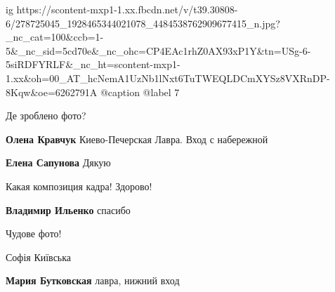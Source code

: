  
 
 
 
 

\ifcmt
  ig https://scontent-mxp1-1.xx.fbcdn.net/v/t39.30808-6/278725045_1928465344021078_4484538762909677415_n.jpg?_nc_cat=100&ccb=1-5&_nc_sid=5cd70e&_nc_ohc=CP4EAc1rhZ0AX93xP1Y&tn=USg-6-5siRDFYRLF&_nc_ht=scontent-mxp1-1.xx&oh=00_AT_hcNemA1UzNb1lNxt6TuTWEQLDCmXYSz8VXRnDP-8Kqw&oe=6262791A
  @caption @label 7
\fi

Де зроблено фото?

\textbf{Олена Кравчук} Киево-Печерская Лавра. Вход с набережной

\textbf{Елена Сапунова} Дякую

Какая композиция кадра! Здорово!

\textbf{Владимир Ильенко} спасибо

Чудове фото!

Софія Київська

\textbf{Мария Бутковская} лавра, нижний вход
